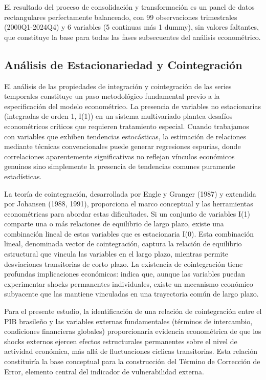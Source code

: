 \documentclass[3p,11pt,draft,natbib=false]{elsarticle}
\begin{document}
El resultado del proceso de consolidación y transformación es un panel de datos rectangulares perfectamente balanceado, con 99 observaciones trimestrales (2000Q1-2024Q4) y 6 variables (5 continuas más 1 dummy), sin valores faltantes, que constituye la base para todas las fases subsecuentes del análisis econométrico.

\subsection{Análisis de Estacionariedad y Cointegración}
\label{sec:cointegration}

El análisis de las propiedades de integración y cointegración de las series temporales constituye un paso metodológico fundamental previo a la especificación del modelo econométrico. La presencia de variables no estacionarias (integradas de orden 1, I(1)) en un sistema multivariado plantea desafíos econométricos críticos que requieren tratamiento especial. Cuando trabajamos con variables que exhiben tendencias estocásticas, la estimación de relaciones mediante técnicas convencionales puede generar regresiones espurias, donde correlaciones aparentemente significativas no reflejan vínculos económicos genuinos sino simplemente la presencia de tendencias comunes puramente estadísticas.

La teoría de cointegración, desarrollada por Engle y Granger (1987) y extendida por Johansen (1988, 1991), proporciona el marco conceptual y las herramientas econométricas para abordar estas dificultades. Si un conjunto de variables I(1) comparte una o más relaciones de equilibrio de largo plazo, existe una combinación lineal de estas variables que es estacionaria I(0). Esta combinación lineal, denominada vector de cointegración, captura la relación de equilibrio estructural que vincula las variables en el largo plazo, mientras permite desviaciones transitorias de corto plazo. La existencia de cointegración tiene profundas implicaciones económicas: indica que, aunque las variables puedan experimentar shocks permanentes individuales, existe un mecanismo económico subyacente que las mantiene vinculadas en una trayectoria común de largo plazo.

Para el presente estudio, la identificación de una relación de cointegración entre el PIB brasileño y las variables externas fundamentales (términos de intercambio, condiciones financieras globales) proporcionaría evidencia econométrica de que los shocks externos ejercen efectos estructurales permanentes sobre el nivel de actividad económica, más allá de fluctuaciones cíclicas transitorias. Esta relación constituiría la base conceptual para la construcción del Término de Corrección de Error, elemento central del indicador de vulnerabilidad externa.
\end{document}
